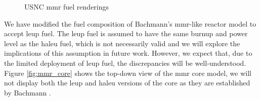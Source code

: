 \begin{figure}[H]
    \hfill
    \caption{
    USNC \gls{mmr} fuel renderings
      \cite{usnc_media_kit}}
    \label{fig:usnc_fuel}
\end{figure}

We have modified the fuel composition of Bachmann's \gls{mmr}-like reactor model to accept \gls{leup} fuel. The \gls{leup} fuel is assumed to have the same burnup and power level as the \gls{haleu} fuel, which is not necessarily valid and we will explore the implications of this assumption in future work. However, we expect that, due to the limited deployment of \gls{leup} fuel, the discrepancies will be well-understood. Figure \ref{fig:mmr_core} shows the top-down view of the \gls{mmr} core model, we will not display both the \gls{leup} and \gls{haleu} versions of the core as they are established by Bachmann \cite{bachmann_thesis_2023}.


